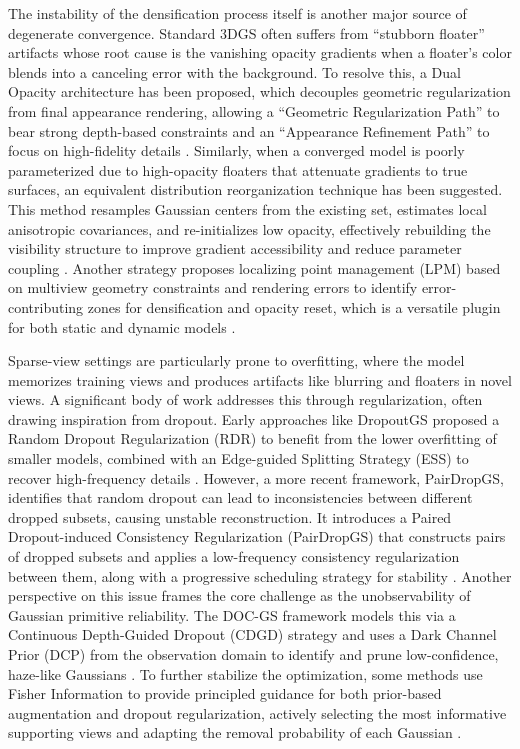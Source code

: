 \documentclass[11pt]{article}
\begin{document}
The instability of the densification process itself is another major source of degenerate convergence. Standard 3DGS often suffers from ``stubborn floater'' artifacts whose root cause is the vanishing opacity gradients when a floater's color blends into a canceling error with the background. To resolve this, a Dual Opacity architecture has been proposed, which decouples geometric regularization from final appearance rendering, allowing a ``Geometric Regularization Path'' to bear strong depth-based constraints and an ``Appearance Refinement Path'' to focus on high-fidelity details \cite{ref174}. Similarly, when a converged model is poorly parameterized due to high-opacity floaters that attenuate gradients to true surfaces, an equivalent distribution reorganization technique has been suggested. This method resamples Gaussian centers from the existing set, estimates local anisotropic covariances, and re-initializes low opacity, effectively rebuilding the visibility structure to improve gradient accessibility and reduce parameter coupling \cite{ref136}. Another strategy proposes localizing point management (LPM) based on multiview geometry constraints and rendering errors to identify error-contributing zones for densification and opacity reset, which is a versatile plugin for both static and dynamic models \cite{ref123}.

Sparse-view settings are particularly prone to overfitting, where the model memorizes training views and produces artifacts like blurring and floaters in novel views. A significant body of work addresses this through regularization, often drawing inspiration from dropout. Early approaches like DropoutGS proposed a Random Dropout Regularization (RDR) to benefit from the lower overfitting of smaller models, combined with an Edge-guided Splitting Strategy (ESS) to recover high-frequency details \cite{ref175}. However, a more recent framework, PairDropGS, identifies that random dropout can lead to inconsistencies between different dropped subsets, causing unstable reconstruction. It introduces a Paired Dropout-induced Consistency Regularization (PairDropGS) that constructs pairs of dropped subsets and applies a low-frequency consistency regularization between them, along with a progressive scheduling strategy for stability \cite{ref176}. Another perspective on this issue frames the core challenge as the unobservability of Gaussian primitive reliability. The DOC-GS framework models this via a Continuous Depth-Guided Dropout (CDGD) strategy and uses a Dark Channel Prior (DCP) from the observation domain to identify and prune low-confidence, haze-like Gaussians \cite{ref177}. To further stabilize the optimization, some methods use Fisher Information to provide principled guidance for both prior-based augmentation and dropout regularization, actively selecting the most informative supporting views and adapting the removal probability of each Gaussian \cite{ref178}.
\end{document}

